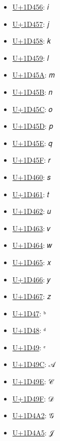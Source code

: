 \begin{itemize}
	\item \href{https://decodeunicode.org/en/u+1D456}{U+1D456}: 𝑖
	\item \href{https://decodeunicode.org/en/u+1D457}{U+1D457}: 𝑗
	\item \href{https://decodeunicode.org/en/u+1D458}{U+1D458}: 𝑘
	\item \href{https://decodeunicode.org/en/u+1D459}{U+1D459}: 𝑙
	\item \href{https://decodeunicode.org/en/u+1D45A}{U+1D45A}: 𝑚
	\item \href{https://decodeunicode.org/en/u+1D45B}{U+1D45B}: 𝑛
	\item \href{https://decodeunicode.org/en/u+1D45C}{U+1D45C}: 𝑜
	\item \href{https://decodeunicode.org/en/u+1D45D}{U+1D45D}: 𝑝
	\item \href{https://decodeunicode.org/en/u+1D45E}{U+1D45E}: 𝑞
	\item \href{https://decodeunicode.org/en/u+1D45F}{U+1D45F}: 𝑟
	\item \href{https://decodeunicode.org/en/u+1D460}{U+1D460}: 𝑠
	\item \href{https://decodeunicode.org/en/u+1D461}{U+1D461}: 𝑡
	\item \href{https://decodeunicode.org/en/u+1D462}{U+1D462}: 𝑢
	\item \href{https://decodeunicode.org/en/u+1D463}{U+1D463}: 𝑣
	\item \href{https://decodeunicode.org/en/u+1D464}{U+1D464}: 𝑤
	\item \href{https://decodeunicode.org/en/u+1D465}{U+1D465}: 𝑥
	\item \href{https://decodeunicode.org/en/u+1D466}{U+1D466}: 𝑦
	\item \href{https://decodeunicode.org/en/u+1D467}{U+1D467}: 𝑧
	\item \href{https://decodeunicode.org/en/u+1D47}{U+1D47}: ᵇ
	\item \href{https://decodeunicode.org/en/u+1D48}{U+1D48}: ᵈ
	\item \href{https://decodeunicode.org/en/u+1D49}{U+1D49}: ᵉ
	\item \href{https://decodeunicode.org/en/u+1D49C}{U+1D49C}: 𝒜
	\item \href{https://decodeunicode.org/en/u+1D49E}{U+1D49E}: 𝒞
	\item \href{https://decodeunicode.org/en/u+1D49F}{U+1D49F}: 𝒟
	\item \href{https://decodeunicode.org/en/u+1D4A2}{U+1D4A2}: 𝒢
	\item \href{https://decodeunicode.org/en/u+1D4A5}{U+1D4A5}: 𝒥

\end{itemize}
